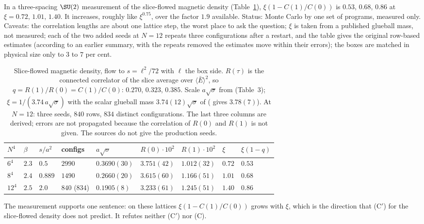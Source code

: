 \begin{observation}\label{neg:obs-matched}
In a three-spacing $\SU(2)$ measurement of the slice-flowed magnetic density
(Table~\ref{neg:tab-matched}), $\xi(1-C(1)/C(0))$ is $0.53$, $0.68$, $0.86$ at $\xi=0.72$, $1.01$,
$1.40$. It increases, roughly like $\xi^{0.75}$, over the factor $1.9$ available. Status: Monte
Carlo by one set of programs, measured only. Caveats: the correlation lengths are about one lattice
step, the worst place to ask the question; $\xi$ is taken from a published glueball mass, not
measured; each of the two added seeds at $N=12$ repeats three configurations after a restart,
and the table gives the original row-based estimates (according to an earlier summary, with the
repeats removed the estimates move within their errors); the boxes are matched in physical size only to $3$ to $7$ per cent.
\end{observation}

\begin{table}[ht]
\centering
\small
\begin{tabular}{@{}lllllllll@{}}
\toprule
$N^4$ & $\beta$ & $s/a^2$ & configs & $a\sqrt\sigma$ & $R(0)\cdot10^2$ & $R(1)\cdot10^2$ & $\xi$ & $\xi(1-q)$ \\
\midrule
$6^4$ & $2.3$ & $0.5$ & $2990$ & $0.3690(30)$ & $3.751(42)$ & $1.012(32)$ & $0.72$ & $0.53$ \\
$8^4$ & $2.4$ & $0.889$ & $1490$ & $0.2660(20)$ & $3.615(60)$ & $1.166(51)$ & $1.01$ & $0.68$ \\
$12^4$ & $2.5$ & $2.0$ & $840$ ($834$) & $0.1905(8)$ & $3.233(61)$ & $1.245(51)$ & $1.40$ & $0.86$ \\
\bottomrule
\end{tabular}
\caption{Slice-flowed magnetic density, flow to $s=\ell^2/72$ with $\ell$ the box side.
$R(\tau)$ is the connected correlator of the slice average over $\langle\bar E\rangle^2$, so
$q=R(1)/R(0)=C(1)/C(0)$: $0.270$, $0.323$, $0.385$. Scale $a\sqrt\sigma$ from \cite{FHK93}
(Table~3); $\xi=1/(3.74\,a\sqrt\sigma)$ with the scalar glueball mass $3.74(12)\sqrt\sigma$ of
\cite{Te98} (\cite{LTW04} gives $3.78(7)$). At $N=12$: three seeds, $840$ rows, $834$ distinct
configurations. The last three columns are derived; errors are not propagated because the
correlation of $R(0)$ and $R(1)$ is not given. The sources do not give the production seeds.}
\label{neg:tab-matched}
\end{table}

The measurement supports one sentence: on these lattices $\xi(1-C(1)/C(0))$ grows with $\xi$,
which is the direction that (C$'$) for the slice-flowed density does not predict. It refutes
neither (C$'$) nor (C).

